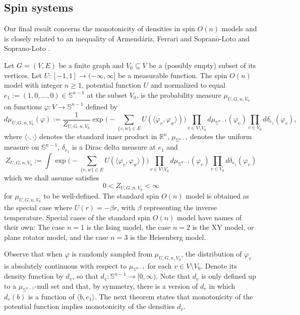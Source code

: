 \documentclass[english]{article}
\theoremstyle{plain}
\theoremstyle{plain}
\begin{document}
\subsection{Spin systems}\label{sec:spin_systems}
Our final result concerns the monotonicity of densities in
spin $O(n)$ models and is closely related to an inequality of
Armend{\'a}riz, Ferrari and Soprano-Loto \cite[Lemma
2.4]{armendariz2015phase} and Soprano-Loto \cite[Section
1.3.6]{soprano2015transicion}.

Let $G = (V, E)$ be a finite graph and
$V_0\subseteq V$ be a (possibly empty) subset of its vertices. Let $U:[-1,1]\to(-\infty,\infty]$ be a measurable function. The
spin $O(n)$ model with integer $n\ge 1$, potential function $U$ and normalized to equal $e_1:=(1,0,\ldots,0)\in\mathbb{S}^{n-1}$ at the
subset $V_0$, is the probability measure $\mu_{U, G, n, V_0}$ on
functions $\varphi:V\to\mathbb{S}^{n-1}$ defined by
\begin{equation}\label{eq:spin_O_n_measure_boundary_conditions}
  d\mu_{U, G, n, V_0}(\varphi) := \frac{1}{Z_{U, G, n, V_0}} \exp\Bigg(-\sum_{\{v,w\}\in E}
  U(\langle \varphi_v, \varphi_w\rangle)\Bigg) \prod_{v\in V\setminus V_0} d\mu_{\mathbb{S}^{n-1}}(\varphi_v) \prod_{v\in V_0} d\delta_{e_1}(\varphi_v),
\end{equation}
where $\langle \cdot, \cdot\rangle$ denotes the standard inner
product in $\mathbb{R}^n$, $\mu_{\mathbb{S}^{n-1}}$ denotes the uniform measure on $\mathbb{S}^{n-1}$,
$\delta_{e_1}$ is a Dirac delta measure at $e_1$ and
\begin{equation*}
  Z_{U, G, n, V_0} := \int \exp\Bigg(-\sum_{\{v,w\}\in E}
  U(\langle \varphi_v, \varphi_w\rangle)\Bigg) \prod_{v\in V\setminus V_0} d\mu_{\mathbb{S}^{n-1}}(\varphi_v) \prod_{v\in V_0} d\delta_{e_1}(\varphi_v)
\end{equation*}
which we shall assume satisfies
\begin{equation}\label{eq:partition_function_condition_spin_systems}
  0 < Z_{U, G, n, V_0} < \infty
\end{equation}
for $\mu_{U, G, n, V_0}$ to be well-defined. The standard spin $O(n)$ model is obtained
as the special case where $U(r) = -\beta r$, with $\beta$
representing the inverse temperature. Special cases of the standard spin $O(n)$ model have names of their own: The case $n=1$ is the Ising model, the case $n=2$ is the XY model, or plane rotator model, and the case $n=3$ is the Heisenberg model.

Observe that when $\varphi$ is randomly sampled from $\mu_{U, G, n, V_0}$,
the distribution of $\varphi_v$ is absolutely continuous with respect to $\mu_{\mathbb{S}^{n-1}}$ for each $v\in V\setminus V_0$. Denote its density function by $d_v$, so that $d_v:\mathbb{S}^{n-1}\to[0,\infty)$. Note that $d_v$ is only defined up to a $\mu_{\mathbb{S}^{n-1}}$-null set and that, by symmetry, there is a version of $d_v$ in which $d_v(b)$ is a function of $\langle b, e_1\rangle$. The next theorem states that
monotonicity of the potential function implies monotonicity of the densities $d_v$.
\end{document}
